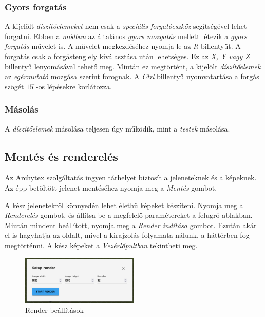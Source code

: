 \subsubsection{Gyors forgatás}

A kijelölt \emph{díszítőelemeket} nem csak a \emph{speciális forgatóeszköz} segítségével lehet
forgatni. Ebben a \emph{módban} az általános \emph{gyors mozgatás} mellett létezik a
\emph{gyors forgatás} művelet is. A művelet megkezdéséhez nyomja le az \emph{R} billentyűt.
A forgatás csak a forgástenglely kiválasztása után lehetséges. Ez
az \emph{X, Y vagy Z} billentyű lenyomásával tehető meg. Miután ez megtörtént, a kijelölt
\emph{díszítőelemek} az \emph{egérmutató} mozgása szerint forognak. A \emph{Ctrl} billentyű
nyomvatartása a forgás szögét $15^{\circ}$-os lépésekre korlátozza.

\subsubsection{Másolás}

A \emph{díszítőelemek} másolása teljesen úgy működik, mint a \emph{testek} másolása.

\subsection{Mentés és renderelés}

Az Archytex szolgáltatás ingyen tárhelyet biztosít a jeleneteknek és a képeknek. Az épp betöltött
jelenet mentéséhez nyomja meg a \emph{Mentés} gombot.

A kész jelenetekről könnyedén lehet élethű képeket készíteni. Nyomja meg a \emph{Renderelés} gombot,
és állítsa be a megfelelő paramétereket a felugró ablakban. Miután mindent beállított, nyomja meg
a \emph{Render indítása} gombot. Ezután akár el is hagyhatja az oldalt, mivel a kirajzolás
folyamata nálunk, a háttérben fog megtörténni. A kész képeket a \emph{Vezérlőpultban} tekintheti
meg.

\begin{figure}[h]
    \centering
    \includegraphics[width=0.5\textwidth]{parts/user-documentation/editor/images/render.png}
    \caption{Render beállítások}
\end{figure}